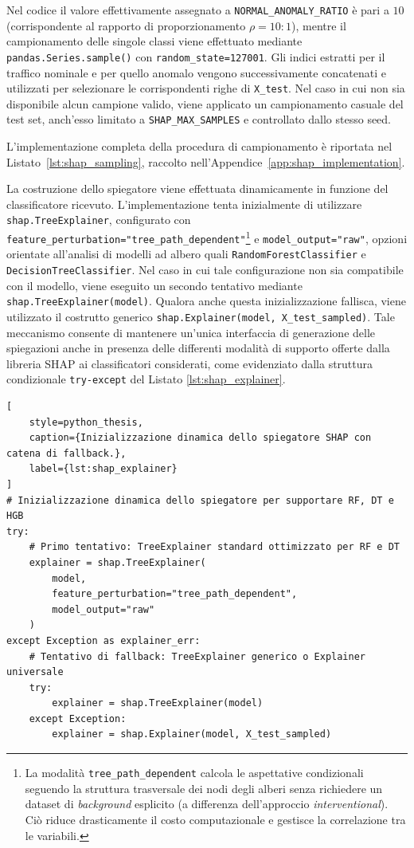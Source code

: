 Nel codice il valore effettivamente assegnato a \texttt{NORMAL\_ANOMALY\_RATIO} è pari a $10$ (corrispondente al rapporto di proporzionamento $\rho = 10:1$), mentre il campionamento delle singole classi viene effettuato mediante \texttt{pandas.Series.sample()} con \texttt{random\_state=127001}. 
Gli indici estratti per il traffico nominale e per quello anomalo vengono successivamente concatenati e utilizzati per selezionare le corrispondenti righe di \texttt{X\_test}. 
Nel caso in cui non sia disponibile alcun campione valido, viene applicato un campionamento casuale del test set, anch'esso limitato a \texttt{SHAP\_MAX\_SAMPLES} e controllato dallo stesso seed.

L'implementazione completa della procedura di campionamento è riportata nel Listato~\ref{lst:shap_sampling}, raccolto nell'Appendice~\ref{app:shap_implementation}.

La costruzione dello spiegatore viene effettuata dinamicamente in funzione del classificatore ricevuto. 
L'implementazione tenta inizialmente di utilizzare \texttt{shap.TreeExplainer}, configurato con \texttt{feature\_perturbation="tree\_path\_dependent"}\footnote{La modalità \texttt{tree\_path\_dependent} calcola le aspettative condizionali seguendo la struttura trasversale dei nodi degli alberi senza richiedere un dataset di \textit{background} esplicito (a differenza dell'approccio \textit{interventional}). Ciò riduce drasticamente il costo computazionale e gestisce la correlazione tra le variabili.} e \texttt{model\_output="raw"}, opzioni orientate all'analisi di modelli ad albero quali \texttt{RandomForestClassifier} e \texttt{DecisionTreeClassifier}. 
Nel caso in cui tale configurazione non sia compatibile con il modello, viene eseguito un secondo tentativo mediante \texttt{shap.TreeExplainer(model)}. 
Qualora anche questa inizializzazione fallisca, viene utilizzato il costrutto generico \texttt{shap.Explainer(model, X\_test\_sampled)}.
Tale meccanismo consente di mantenere un'unica interfaccia di generazione delle spiegazioni anche in presenza delle differenti modalità di supporto offerte dalla libreria SHAP ai classificatori considerati, come evidenziato dalla struttura condizionale \texttt{try-except} del Listato \ref{lst:shap_explainer}. 

\begin{lstlisting}[
    style=python_thesis,
    caption={Inizializzazione dinamica dello spiegatore SHAP con catena di fallback.},
    label={lst:shap_explainer}
]
# Inizializzazione dinamica dello spiegatore per supportare RF, DT e HGB
try:
    # Primo tentativo: TreeExplainer standard ottimizzato per RF e DT
    explainer = shap.TreeExplainer(
        model, 
        feature_perturbation="tree_path_dependent", 
        model_output="raw"
    )
except Exception as explainer_err:
    # Tentativo di fallback: TreeExplainer generico o Explainer universale
    try:
        explainer = shap.TreeExplainer(model)
    except Exception:
        explainer = shap.Explainer(model, X_test_sampled)
\end{lstlisting}

